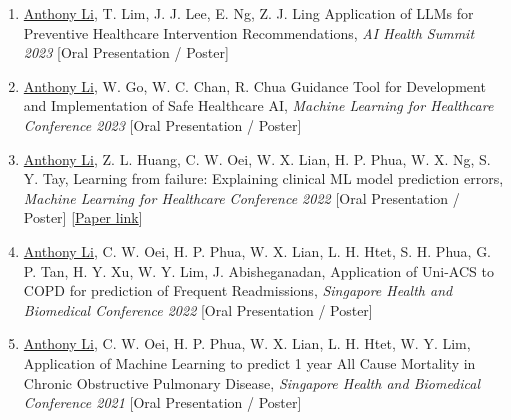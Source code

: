 \documentclass[letterpaper,10pt,oneside]{article}
\begin{document}
\begin{body}
\begin{enumerate}
\item \underline{Anthony Li}, T. Lim, J. J. Lee, E. Ng, Z. J. Ling \textcolor{mygray}{Application of LLMs for Preventive Healthcare Intervention Recommendations}, \textit{AI Health Summit 2023} [Oral Presentation / Poster]

\item \underline{Anthony Li}, W. Go, W. C. Chan, R. Chua \textcolor{mygray}{Guidance Tool for Development and Implementation of Safe Healthcare AI}, \textit{Machine Learning for Healthcare Conference 2023} [Oral Presentation / Poster]

\item \underline{Anthony Li}, Z. L. Huang, C. W. Oei, W. X. Lian, H. P. Phua, W. X. Ng, S. Y. Tay, \textcolor{mygray}{Learning from failure: Explaining clinical ML model prediction errors}, \textit{Machine Learning for Healthcare Conference 2022} [Oral Presentation / Poster]
[\href{https://static1.squarespace.com/static/59d5ac1780bd5ef9c396eda6/t/62e97c1b5754a426fa21d3bf/1659468827549/16+MLHC_Explaining_ML_model_failures_v4.pdf}{Paper link}]

\item \underline{Anthony Li}, C. W. Oei, H. P. Phua, W. X. Lian, L. H. Htet, S. H. Phua, G. P. Tan, H. Y. Xu, W. Y. Lim, J. Abisheganadan, \textcolor{mygray}{Application of Uni-ACS to COPD for prediction of Frequent Readmissions}, \textit{Singapore Health and Biomedical Conference 2022} [Oral Presentation / Poster]

\item \underline{Anthony Li}, C. W. Oei, H. P. Phua, W. X. Lian, L. H. Htet, W. Y. Lim, \textcolor{mygray}{Application of Machine Learning to predict 1 year All Cause Mortality in Chronic Obstructive Pulmonary Disease}, \textit{Singapore Health and Biomedical Conference 2021} [Oral Presentation / Poster]




\end{enumerate}
\end{body}
\end{document}
